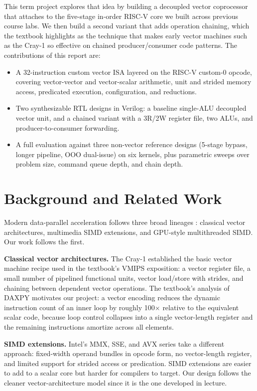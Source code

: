 \documentclass[conference]{IEEEtran}
\begin{document}
This term project explores that idea by building a decoupled vector
coprocessor that attaches to the five-stage in-order RISC-V core we
built across previous course labs. We then build a second variant
that adds operation chaining, which the textbook
\cite{hp_book} highlights as the technique that makes early
vector machines such as the Cray-1 \cite{cray1} so effective on
chained producer/consumer code patterns. The contributions of this
report are:
\begin{itemize}
\item A 32-instruction custom vector ISA layered on the RISC-V
  custom-0 opcode, covering vector-vector and vector-scalar
  arithmetic, unit and strided memory access, predicated execution,
  configuration, and reductions.
\item Two synthesizable RTL designs in Verilog: a baseline single-ALU
  decoupled vector unit, and a chained variant with a 3R/2W register
  file, two ALUs, and producer-to-consumer forwarding.
\item A full evaluation against three non-vector reference designs
  (5-stage bypass, longer pipeline, OOO dual-issue) on six kernels,
  plus parametric sweeps over problem size, command queue depth, and
  chain depth.
\end{itemize}

\section{Background and Related Work}
Modern data-parallel acceleration follows three broad lineages
\cite{hp_book}: classical vector architectures, multimedia SIMD
extensions, and GPU-style multithreaded SIMD. Our work follows the
first.

\textbf{Classical vector architectures.} The Cray-1 \cite{cray1}
established the basic vector machine recipe used in the textbook's
VMIPS exposition: a vector register file, a small number of pipelined
functional units, vector load/store with strides, and chaining
between dependent vector operations. The textbook's analysis
\cite[Ch.~4]{hp_book} of DAXPY motivates our project: a vector
encoding reduces the dynamic instruction count of an inner loop by
roughly 100$\times$ relative to the equivalent scalar code, because
loop control collapses into a single vector-length register and the
remaining instructions amortize across all elements.

\textbf{SIMD extensions.} Intel's MMX, SSE, and AVX series
\cite{avx_isa} take a different approach: fixed-width operand
bundles in opcode form, no vector-length register, and limited
support for strided access or predication. SIMD extensions are
easier to add to a scalar core but harder for compilers to target.
Our design follows the cleaner vector-architecture model since it is
the one developed in lecture.
\end{document}
